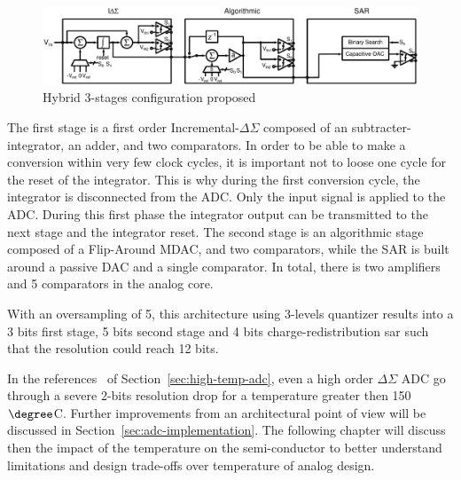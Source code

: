 \begin{figure}[htp]
	\centering
	\includegraphics[width=\textwidth]{Chapter3/Figs/architecture-full-principle.ps}
	\caption{Hybrid 3-stages configuration proposed}
	\label{fig:hybrid-selected-topology}
\end{figure}

The first stage is a first order Incremental-\(\Delta\Sigma \) composed of an subtracter-integrator, an adder, and two comparators. In order to be able to make a conversion within very few clock cycles, it is important not to loose one cycle for the reset of the integrator. This is why during the first conversion cycle, the
integrator is disconnected from the ADC\@. Only the input signal is applied to the ADC\@. During this first phase the integrator output can be transmitted to the next stage and the integrator reset. The second stage is an algorithmic stage composed of a Flip-Around MDAC, and two comparators, while the SAR is built around a passive DAC and a single comparator. In total, there is two amplifiers and 5 comparators in the analog core.

With an oversampling of 5, this architecture using 3-levels quantizer results into a 3 bits first stage, 5 bits second stage and 4 bits charge-redistribution sar such that the resolution could reach 12 bits.

In the references~\cite{Ericson2004} of Section~\ref{sec:high-temp-adc}, even a high order \(\Delta\Sigma \) ADC go through a severe 2-bits resolution drop for a temperature greater then 150\(\degree \)C. Further improvements from an architectural point of view will be discussed in Section~\ref{sec:adc-implementation}. The following chapter will discuss then the impact of the temperature on the semi-conductor to better understand limitations and design trade-offs over temperature of analog design.
